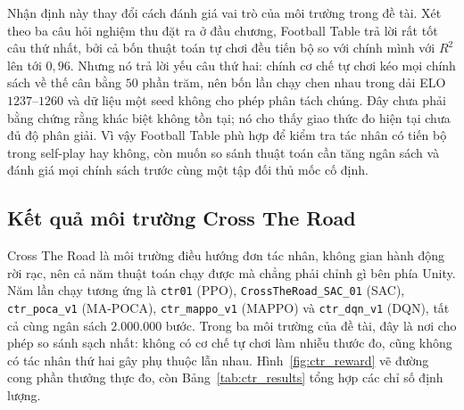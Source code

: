 \indent Nhận định này thay đổi cách đánh giá vai trò của môi trường trong đề tài. Xét theo ba
câu hỏi nghiệm thu đặt ra ở đầu chương, Football Table trả lời rất tốt câu thứ nhất, bởi cả
bốn thuật toán tự chơi đều tiến bộ so với chính mình với $R^{2}$ lên tới $0{,}96$. Nhưng nó
trả lời yếu câu thứ hai: chính cơ chế tự chơi kéo mọi chính sách về thế cân bằng $50$ phần
trăm, nên bốn lần chạy chen nhau trong dải ELO $1237$--$1260$ và dữ liệu một seed không cho
phép phân tách chúng. Đây chưa phải bằng chứng rằng khác biệt không tồn tại; nó cho thấy giao
thức đo hiện tại chưa đủ độ phân giải. Vì vậy Football Table phù hợp để kiểm tra tác nhân có
tiến bộ trong self-play hay không, còn muốn so sánh thuật toán cần tăng ngân sách và đánh giá
mọi chính sách trước cùng một tập đối thủ mốc cố định.

\subsection{Kết quả môi trường Cross The Road}

{\sloppy
\indent Cross The Road là môi trường điều hướng đơn tác nhân, không gian hành động rời
rạc, nên cả năm thuật toán chạy được mà chẳng phải chỉnh gì bên phía Unity. Năm lần chạy
tương ứng là \texttt{ctr01} (PPO), \texttt{CrossTheRoad\_SAC\_01} (SAC),
\texttt{ctr\_poca\_v1} (MA-POCA), \texttt{ctr\_mappo\_v1} (MAPPO) và \texttt{ctr\_dqn\_v1}
(DQN), tất cả cùng ngân sách $2.000.000$ bước. Trong ba môi trường của đề tài, đây là nơi
cho phép so sánh sạch nhất: không có cơ chế tự chơi làm nhiễu thước đo, cũng không có tác
nhân thứ hai gây phụ thuộc lẫn nhau. Hình~\ref{fig:ctr_reward} vẽ đường cong phần thưởng
thực đo, còn Bảng~\ref{tab:ctr_results} tổng hợp các chỉ số định lượng.\par}

